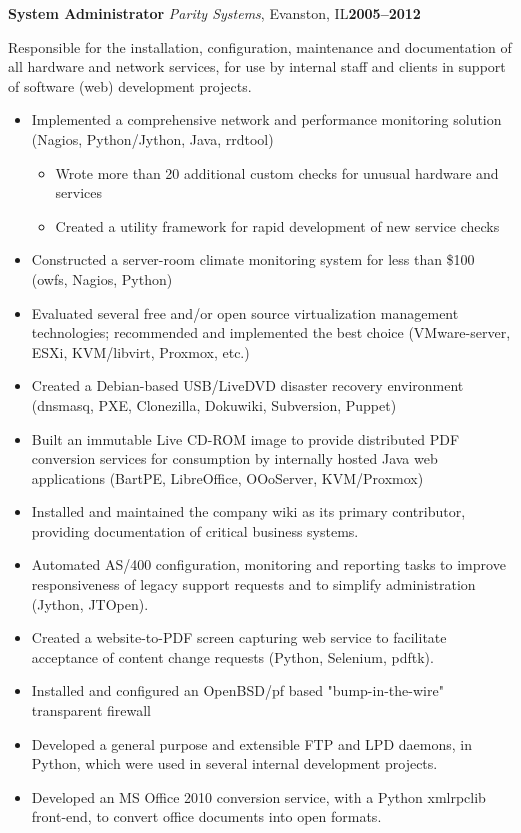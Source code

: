 \documentclass[11pt,letterpaper]{article}
\newcommand{\cventry}[5]{%
{\bfseries{#2}} {\small{\textit{#3}, #4}}\hfill {\small\bfseries{#1}}
\begin{adjustwidth}{1em}{2em}{\raggedright{#5}}\end{adjustwidth}
}
\begin{document}
\cventry{2005--2012}{System Administrator}{Parity Systems}{Evanston, IL}{%
{Responsible for the installation, configuration, maintenance and documentation
of all hardware and network services, for use by internal staff and clients
in support of software (web) development projects.}

\begin{small}
\begin{itemize}
\item Implemented a comprehensive network and performance monitoring solution
      (Nagios, Python/Jython, Java, rrdtool)
      \begin{itemize}
      \item Wrote more than 20 additional custom checks for unusual hardware
            and services
      \item Created a utility framework for rapid development of new service
            checks
      \end{itemize}
\item Constructed a server-room climate monitoring system for less than \$100
      (owfs, Nagios, Python)
\item Evaluated several free and/or open source virtualization management
      technologies; recommended and implemented the best choice (VMware-server,
      ESXi, KVM/libvirt, Proxmox, etc.)
\item Created a Debian-based USB/LiveDVD disaster recovery environment (dnsmasq,
      PXE, Clonezilla, Dokuwiki, Subversion, Puppet)
\item Built an immutable Live CD-ROM image to provide distributed
      PDF conversion services for consumption by internally hosted Java web
      applications (BartPE, LibreOffice, OOoServer, KVM/Proxmox)
\item Installed and maintained the company wiki as its primary contributor,
      providing documentation of critical business systems.
\item Automated AS/400 configuration, monitoring and reporting tasks to
      improve responsiveness of legacy support requests and to simplify
      administration (Jython, JTOpen).
\item Created a website-to-PDF screen capturing web service
      to facilitate acceptance of content change requests (Python, Selenium,
      pdftk).
\item Installed and configured an OpenBSD/pf based "bump-in-the-wire"
      transparent firewall
\item Developed a general purpose and extensible FTP and LPD daemons, in Python,
       which were used in several internal development projects.
\item Developed an MS Office 2010 conversion service, with a Python xmlrpclib
      front-end, to convert office documents into open formats.
\end{itemize}
\end{small}
}
\end{document}
